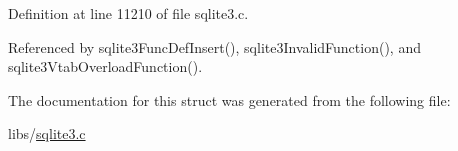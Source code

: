 Definition at line 11210 of file sqlite3.\+c.



Referenced by sqlite3\+Func\+Def\+Insert(), sqlite3\+Invalid\+Function(), and sqlite3\+Vtab\+Overload\+Function().



The documentation for this struct was generated from the following file\+:\begin{DoxyCompactItemize}
\item 
libs/\hyperlink{sqlite3_8c}{sqlite3.\+c}\end{DoxyCompactItemize}
